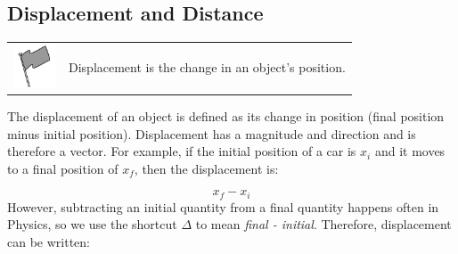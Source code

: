             \subsection{ Displacement and Distance}
            \nopagebreak
\par
            \label{m38788*fhsst!!!underscore!!!id156}\begin{definition}
	  \begin{tabular*}{15 cm}{m{15 mm}m{}}
	\hspace*{-50pt}  \includegraphics[width=0.5in]{col11305.imgs/psflag2.png}   & \Definition{   \label{id2527121}\textbf{ Displacement }} { \label{m38788*meaningfhsst!!!underscore!!!id156}
      \label{m38788*id62992}Displacement is the change in an object's position. \par 
       } 
      \end{tabular*}
      \end{definition}
      \label{m38788*id63003}The displacement of an object is defined as its change in position (final position minus initial position). Displacement has a magnitude and direction and is therefore a vector. For example, if the initial position of a car is ${x}_{i}$ and it moves to a final position of ${x}_{f}$, then the displacement is:\par 
      \label{m38788*id63035}\nopagebreak\noindent{}
        
    \begin{equation}
    {x}_{f}-{x}_{i}\tag{20.1}
      \end{equation}
      \label{m38788*id63061}However, subtracting an initial quantity from a final quantity happens often in Physics, so we use the shortcut $\Delta $ to mean \textsl{final - initial}. Therefore, displacement can be written:\par 
      \label{m38788*id63080}\nopagebreak\noindent{}
        

